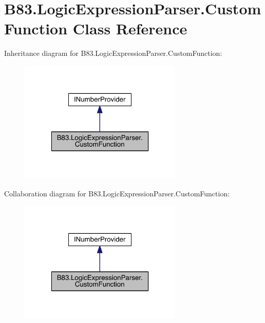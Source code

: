\hypertarget{class_b83_1_1_logic_expression_parser_1_1_custom_function}{}\section{B83.\+Logic\+Expression\+Parser.\+Custom\+Function Class Reference}
\label{class_b83_1_1_logic_expression_parser_1_1_custom_function}


Inheritance diagram for B83.\+Logic\+Expression\+Parser.\+Custom\+Function\+:\nopagebreak
\begin{figure}[H]
\begin{center}
\leavevmode
\includegraphics[width=220pt]{class_b83_1_1_logic_expression_parser_1_1_custom_function__inherit__graph}
\end{center}
\end{figure}


Collaboration diagram for B83.\+Logic\+Expression\+Parser.\+Custom\+Function\+:\nopagebreak
\begin{figure}[H]
\begin{center}
\leavevmode
\includegraphics[width=220pt]{class_b83_1_1_logic_expression_parser_1_1_custom_function__coll__graph}
\end{center}
\end{figure}
